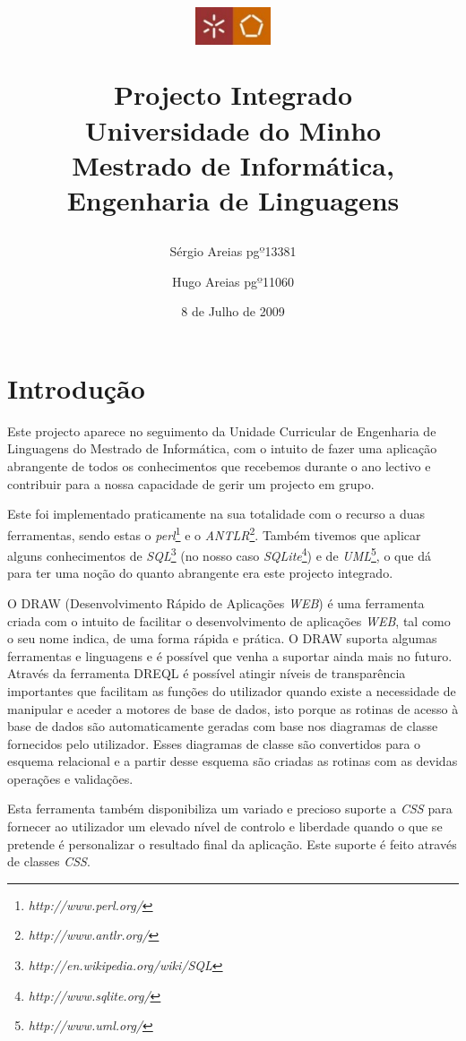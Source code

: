 \documentclass[a4paper]{article}
\title{\huge \bigskip
\begin{figure}[!ht]
\begin{flushright}
\includegraphics[width=0.2\textwidth]{./Images/um-eng.jpg} \vspace{1cm}
\end{flushright}
\end{figure}
{\huge Projecto Integrado} \vspace{3cm} \\
{\LARGE Universidade do Minho}\\
{\large Mestrado de Informática, Engenharia de Linguagens}
}
\author{\large Sérgio Areias pg$º$13381 \and \large Hugo Areias pg$º$11060}
\date{\vspace{3cm} \LARGE 8 de Julho de 2009}
\begin{document}
\maketitle
\newpage
\large \tableofcontents
{}

\newpage
\section{\LARGE Introdução}


\hspace{1cm}Este projecto aparece no seguimento da Unidade Curricular de Engenharia de Linguagens do Mestrado de Informática, com o intuito de fazer uma aplicação abrangente de todos os conhecimentos que recebemos durante o ano lectivo e contribuir para a nossa capacidade de gerir um projecto em grupo.

\hspace{1cm}Este foi implementado praticamente na sua totalidade com o recurso a duas ferramentas, sendo estas o {\em perl}\footnote{{\em http://www.perl.org/}} e o {\em ANTLR}\footnote{{\em http://www.antlr.org/}}. Também tivemos que aplicar alguns conhecimentos de {\em SQL}\footnote{{\em http://en.wikipedia.org/wiki/SQL}} (no nosso caso {\em SQLite}\footnote{{\em http://www.sqlite.org/}}) e de {\em UML}\footnote{{\em http://www.uml.org/}}, o que dá para ter uma noção do quanto abrangente era este projecto integrado.

\hspace{1cm}O DRAW (Desenvolvimento Rápido de Aplicações \emph{WEB}) é uma ferramenta criada com o intuito de facilitar o desenvolvimento de aplicações \emph{WEB},
tal como o seu nome indica, de uma forma rápida e prática. O DRAW suporta algumas ferramentas e linguagens e é possível que venha a suportar ainda mais no futuro.
Através da ferramenta DREQL é possível atingir níveis de transparência importantes que facilitam as funções do utilizador quando existe a necessidade de manipular e
aceder a motores de base de dados, isto porque as rotinas de acesso à base de dados são automaticamente geradas com base nos diagramas de classe fornecidos pelo
utilizador. Esses diagramas de classe são convertidos para o esquema relacional e a partir desse esquema são criadas as rotinas com as devidas operações e validações.

\hspace{1cm}Esta ferramenta também disponibiliza um variado e precioso suporte a \emph{CSS} para fornecer ao utilizador um elevado nível de controlo e liberdade
quando o que se pretende é personalizar o resultado final da aplicação. Este suporte é feito através de classes \emph{CSS}.
\end{document}
